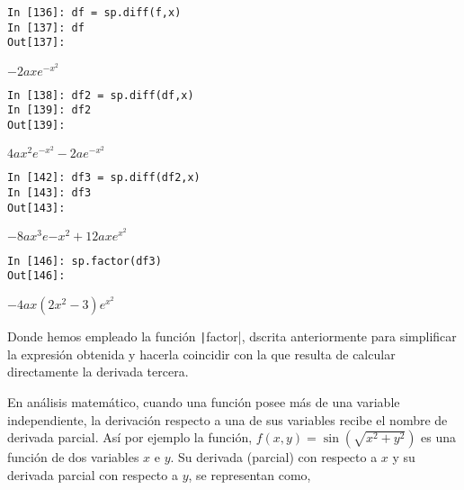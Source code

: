 \begin{center}
	\begin{minipage}{.5\textwidth}
		\begin{verbatim}
In [136]: df = sp.diff(f,x)
In [137]: df
Out[137]: 			
		\end{verbatim}
		$-2axe^{-x^2}$
		\begin{verbatim}
In [138]: df2 = sp.diff(df,x)
In [139]: df2
Out[139]: 
		\end{verbatim}
		$4ax^2e^{-x^2}-2ae^{-x^2}$
		\begin{verbatim}
In [142]: df3 = sp.diff(df2,x)
In [143]: df3
Out[143]:  
		\end{verbatim}
		$-8ax^3e{-x^2} + 12axe^{x^2}$
		\begin{verbatim}
In [146]: sp.factor(df3)
Out[146]:   
\end{verbatim}
$-4ax(2x^2-3)e^{x^2}$
	\end{minipage}
\end{center}
\begin{paracol}{2}
\noindent Donde hemos empleado la función \texttt|factor|, dscrita anteriormente para simplificar la expresión obtenida y hacerla coincidir con la que resulta de calcular directamente la derivada tercera.

En análisis matemático, cuando una función posee más de una variable independiente, la derivación respecto a una de sus variables recibe el nombre de derivada parcial. Así por ejemplo la función,
$f(x,y) =\sin \left( \sqrt{x^2+y^2} \right)$ es una función de dos variables $x$ e $y$. Su derivada (parcial) con respecto a $x$ y su derivada parcial con respecto a $y$, se representan como,
\end{paracol}

